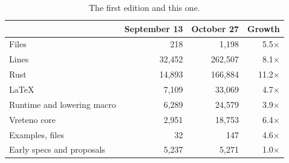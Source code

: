 \documentclass[journal,onecolumn,9pt]{IEEEtran}
\begin{document}
\begin{table}[h]
\caption{The first edition and this one.}
\label{tab:stats-growth}
\centering
\begin{tabular}{@{}lrrr@{}}
\toprule
 & September 13 & October 27 & Growth \\
\midrule
Files & 218 & 1,198 & 5.5$\times$ \\
Lines & 32,452 & 262,507 & 8.1$\times$ \\
Rust & 14,893 & 166,884 & 11.2$\times$ \\
\LaTeX{} & 7,109 & 33,069 & 4.7$\times$ \\
Runtime and lowering macro & 6,289 & 24,579 & 3.9$\times$ \\
Vreteno core & 2,951 & 18,753 & 6.4$\times$ \\
Examples, files & 32 & 147 & 4.6$\times$ \\
Early specs and proposals & 5,237 & 5,271 & 1.0$\times$ \\
\bottomrule
\end{tabular}
\end{table}
\end{document}
